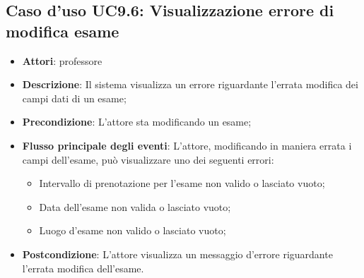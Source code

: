 \subsection{Caso d'uso \texorpdfstring{UC9.6}{UC9.6}: Visualizzazione errore di modifica esame}
\begin{itemize}
\item \textbf{Attori}: professore
\item \textbf{Descrizione}: Il sistema visualizza un errore riguardante l'errata modifica dei campi dati di un esame;
\item \textbf{Precondizione}: L'attore sta modificando un esame;
\item \textbf{Flusso principale degli eventi}: L'attore, modificando in maniera errata i campi dell'esame, può visualizzare uno dei seguenti errori: \begin{itemize}
\item Intervallo di prenotazione per l’esame non valido o lasciato vuoto;
\item Data dell’esame non valida o lasciato vuoto;
\item Luogo d’esame non valido o lasciato vuoto;
\end{itemize}
\item \textbf{Postcondizione}: L'attore visualizza un messaggio d'errore riguardante l'errata modifica dell'esame.
\end{itemize}
